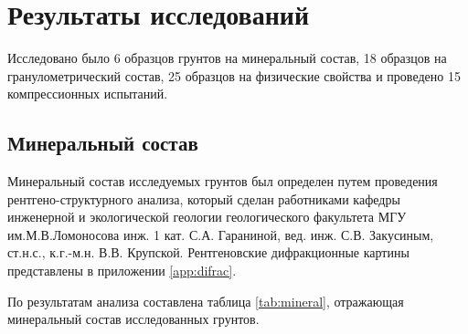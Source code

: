 \chapter{Результаты исследований}\label{ch:ch7}

Исследовано было 6 образцов грунтов на минеральный состав, 18 образцов 
на гранулометрический состав, 25 образцов на физические свойства и 
проведено 15 компрессионных испытаний.

\section{Минеральный состав}

Минеральный состав исследуемых грунтов был определен путем проведения 
рентгено-структурного 
анализа, который сделан работниками кафедры  инженерной и экологической геологии 
геологического факультета МГУ им.М.В.Ломоносова
инж. 1 кат. С.А. Гараниной, вед. инж. С.В. Закусиным, ст.н.с., к.г.-м.н. В.В. Крупской.
Рентгеновские дифракционные картины представлены в приложении \ref{app:difrac}.

По результатам анализа составлена таблица \ref{tab:mineral}, отражающая минеральный состав 
исследованных грунтов.

